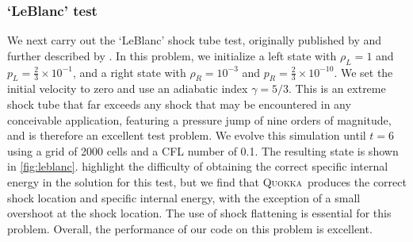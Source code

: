 \documentclass[fleqn,usenatbib]{mnras}
\newcommand{\quokka}{\textsc{Quokka}}
\begin{document}
\subsubsection{`LeBlanc' test}
\label{section:leblanc}
We next carry out the `LeBlanc' shock tube test, originally published by \cite{Benson_1992} and further described by \cite{Pember_2001}. In this problem, we initialize a left state with $\rho_L = 1$ and $p_L = \frac{2}{3} \times 10^{-1}$, and a right state with $\rho_R = 10^{-3}$ and $p_R = \frac{2}{3} \times 10^{-10}$. We set the initial velocity to zero and use an adiabatic index $\gamma = 5/3$. This is an extreme shock tube that far exceeds any shock that may be encountered in any conceivable application, featuring a pressure jump of nine orders of magnitude, and is therefore an excellent test problem.  We evolve this simulation until $t = 6$ using a grid of 2000 cells and a CFL number of 0.1. The resulting state is shown in \autoref{fig:leblanc}. \cite{Pember_2001} highlight the difficulty of obtaining the correct specific internal energy in the solution for this test, but we find that \quokka~produces the correct shock location and specific internal energy, with the exception of a small overshoot at the shock location. The use of shock flattening is essential for this problem. Overall, the performance of our code on this problem is excellent.
\end{document}

